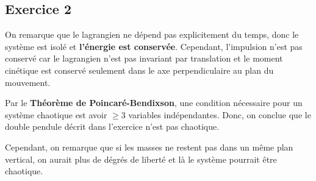 \documentclass[french]{article}
\begin{document}
	\subsection*{Exercice 2}
	
	On remarque que le lagrangien ne dépend pas explicitement du temps, donc le système est isolé et \textbf{l'énergie est conservée}. Cependant, l'impulsion n'est pas conservé car le lagrangien n'est pas invariant par translation et le moment cinétique est conservé seulement dans le axe perpendiculaire au plan du mouvement.
	
	Par le \textbf{Théorème de Poincaré-Bendixson}, une condition nécessaire pour un système chaotique est avoir $\geq 3$ variables indépendantes. Donc, on conclue que le double pendule décrit dans l'exercice n'est pas chaotique.
	
	Cependant, on remarque que si les masses ne restent pas dans un même plan vertical, on aurait plus de dégrés de liberté et là le système pourrait être chaotique.
	
\end{document}
